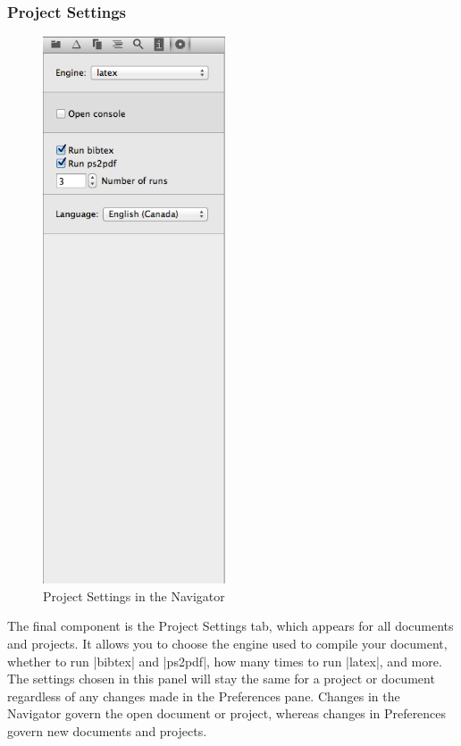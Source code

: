 \subsubsection{Project Settings}
\begin{figure}
\includegraphics[width=0.48\textwidth, trim = 0 7.45in 0 0, clip = true]{TeXnicle-Images/texnicle-nav-projsettings.png}
\caption{Project Settings in the Navigator}
\label{fig:texnicle-nav-projsettings}
\end{figure}
The final component is the Project Settings tab, which appears for all documents and projects. It allows you to choose the engine used to compile your document, whether to run |bibtex| and |ps2pdf|, how many times to run |latex|, and more. The settings chosen in this panel will stay the same for a project or document regardless of any changes made in the Preferences pane. Changes in the Navigator govern the open document or project, whereas changes in Preferences govern new documents and projects.
\pagebreak\clearpage

